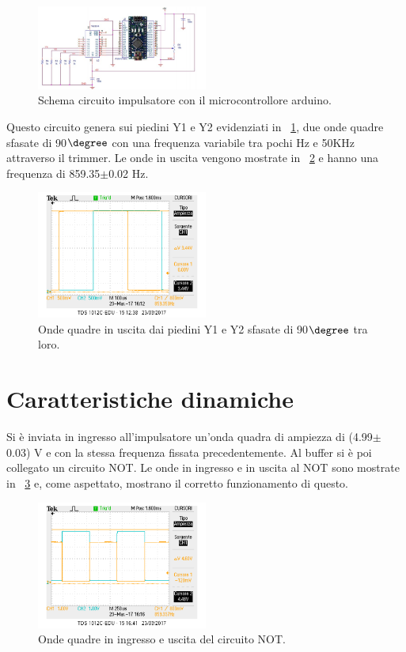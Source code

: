 \documentclass[a4paper,10pt]{article}
\begin{document}
{\begin{figure}[H]
	\centering
	\includegraphics[width=0.5\textwidth]{../grafici/schardu.png}
	\caption{Schema circuito impulsatore con il microcontrollore arduino.}
	\label{fig:schardu}
\end{figure}

Questo circuito genera sui piedini Y1 e Y2 evidenziati in \figurename{~\ref{fig:schardu}}, due onde quadre sfasate di 90$\degree$ con una frequenza variabile tra pochi Hz e 50KHz attraverso il trimmer. Le onde in uscita vengono mostrate in \figurename{~\ref{fig:ardu}} e hanno una frequenza di 859.35$\pm$0.02 Hz.

\begin{figure}[H]
	\centering
	\includegraphics[width=0.5\textwidth]{../grafici/ardu.png}
	\caption{Onde quadre in uscita dai piedini Y1 e Y2 sfasate di 90$\degree$ tra loro.}
	\label{fig:ardu}
\end{figure}


\section{Caratteristiche dinamiche}
Si è inviata in ingresso all'impulsatore un’onda quadra di ampiezza di (4.99$\pm$0.03) V e con la stessa frequenza fissata precedentemente. Al buffer si è poi collegato un circuito NOT. Le onde in ingresso e in uscita al NOT sono mostrate in \figurename{~\ref{fig:notardu}} e, come aspettato, mostrano il corretto funzionamento di questo.

\begin{figure}[H]
	\centering
	\includegraphics[width=0.5\textwidth]{../grafici/notardu.png}
	\caption{Onde quadre in ingresso e uscita del circuito NOT.}
	\label{fig:notardu}
\end{figure}

}
\end{document}
